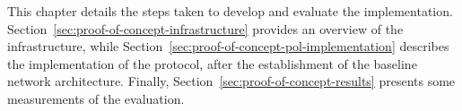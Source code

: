 This chapter details the steps taken to develop and evaluate the \poc{} implementation. Section~\ref{sec:proof-of-concept-infrastructure} provides an overview of the infrastructure, while Section~\ref{sec:proof-of-concept-pol-implementation} describes the implementation of the \pol{} protocol, after the establishment of the baseline network architecture. Finally, Section~\ref{sec:proof-of-concept-results} presents some measurements of the \poc{} evaluation.

